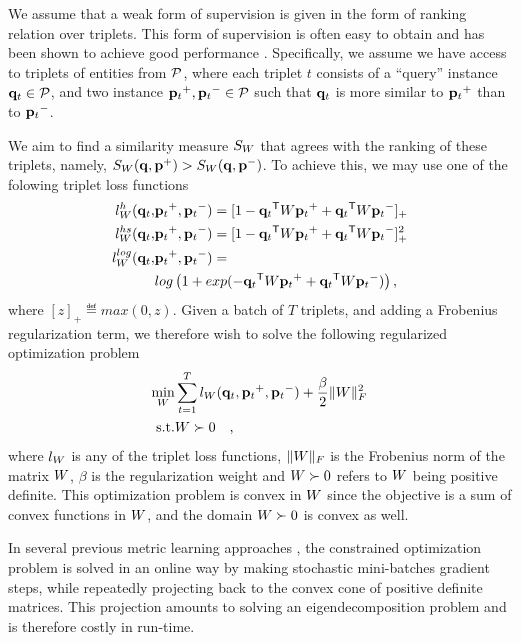 \documentclass{article}
\begin{document}
We assume that a weak form of supervision is given in the form of
ranking relation over triplets. This form of supervision is often easy
to obtain and has been shown to achieve good performance
\cite{weinberger2006dml,OASIS,qian}. Specifically, we assume we have access to
triplets of entities from $\cal{P}$, where each triplet $t$ consists of
a ``query'' instance ${{\mathbf{q}}_{{t}}} \in \cal{P}$, and two instance ${{\mathbf{p}}_{{t}}}^{+}, {{\mathbf{p}}_{{t}}}^{-} \in \cal{P}$ such that ${{\mathbf{q}}_{{t}}}$ is more similar to ${{\mathbf{p}}_{{t}}}^{+}$
than to ${{\mathbf{p}}_{{t}}}^{-}$.

We aim to find a similarity measure $S_{{W}}$ that agrees with the ranking of these triplets, namely, $S_{{W}}({\mathbf{q}}, {\mathbf{p}}^{+}) > S_{{W}}({\mathbf{q}},
{\mathbf{p}}^{-})$. To achieve this, we may use one of the folowing triplet loss functions
\begin{align}
\label{single-triplet-hinge-loss}
l_{{W}}^h({{\mathbf{q}}_{{t}}}, &{{\mathbf{p}}_{{t}}}^{+}, {{\mathbf{p}}_{{t}}}^{-}) = [1-{{\mathbf{q}}_{{t}}}{}^\mathsf{T}{W}{{\mathbf{p}}_{{t}}}^+ + {{\mathbf{q}}_{{t}}}{}^\mathsf{T}{W}{{\mathbf{p}}_{{t}}}^-]_{+}
 \\ \nonumber
 \label{single-triplet-hinge-loss2}
l_{{W}}^{hs}({{\mathbf{q}}_{{t}}}, &{{\mathbf{p}}_{{t}}}^+, {{\mathbf{p}}_{{t}}}^-) = [1-{{\mathbf{q}}_{{t}}}{}^\mathsf{T}{W}{{\mathbf{p}}_{{t}}}^+ + {{\mathbf{q}}_{{t}}}{}^\mathsf{T}{W}{{\mathbf{p}}_{{t}}}^-]_{+}^2
 \\ \nonumber
 \label{single-triplet-log-loss} 
l_{{W}}^{log}({{\mathbf{q}}_{{t}}}, &{{\mathbf{p}}_{{t}}}^+, {{\mathbf{p}}_{{t}}}^-) = \\ 
&log\left(1+exp(-{{\mathbf{q}}_{{t}}}{}^\mathsf{T}{W}{{\mathbf{p}}_{{t}}}^+ + {{\mathbf{q}}_{{t}}}{}^\mathsf{T}{W}{{\mathbf{p}}_{{t}}}^-)\right) \nonumber ,
\end{align}
where $[z]_{+} \eqdef max(0,z)$.  Given a batch of $T$ triplets, and adding a Frobenius regularization term, we therefore wish to solve the following regularized optimization problem
\begin{eqnarray}
  \min_{{W}}& \sum_{{t}=1}^T  l_{{W}}({{\mathbf{q}}_{{t}}}, {{\mathbf{p}}_{{t}}}^+, {{\mathbf{p}}_{{t}}}^-) + \frac{\beta}{2} {\|{W}\|_F^2}
 \\  \nonumber
   \rm{s.t.}& {W} \succ 0 \quad,
  \label{hingelt}
\end{eqnarray}
where $l_{{W}}$ is any of the triplet loss functions, ${\|{W}\|_F}$ is the Frobenius norm of the matrix ${W}$, $\beta$ is the regularization weight and ${W} \succ 0$ refers to ${W}$ being positive definite. This optimization problem is convex in ${W}$ since the objective is a sum of convex functions in ${W}$, and the domain ${W} \succ 0$ is convex as well.

In several previous metric learning approaches \cite{qianHD, qian}, the constrained optimization problem is solved in an online way by making stochastic mini-batches gradient steps, while repeatedly projecting back to the convex cone of positive definite matrices. This projection amounts to solving an eigendecomposition problem and is therefore costly in run-time.
\end{document}
